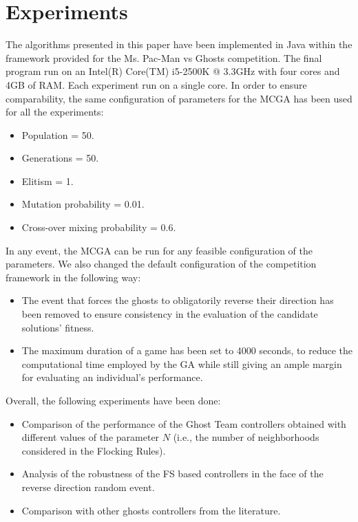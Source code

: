\documentclass[journal]{IEEEtran}
\begin{document}
\section{Experiments}
\label{sec:Experiments}
The algorithms presented in this paper have been implemented in Java within the framework provided for the Ms. Pac-Man vs Ghosts competition. The final program run on an Intel(R) Core(TM) i5-2500K @ 3.3GHz with four cores and 4GB of RAM. Each experiment run on a single core. In order to ensure comparability, the same configuration of parameters for the MCGA has been used for all the experiments:

\begin{itemize}
  \item Population = 50.
  \item Generations = 50.
  \item Elitism = 1.
  \item Mutation probability = 0.01.
  \item Cross-over mixing probability = 0.6.
\end{itemize}

In any event, the MCGA can be run for any feasible configuration of the parameters. We also changed the default configuration of the competition framework in the following way:

\begin{itemize}
  \item The event that forces the ghosts to obligatorily reverse their direction has been removed to ensure consistency in the evaluation of the candidate solutions' fitness.
  \item The maximum duration of a game has been set to 4000 seconds, to reduce the computational time employed by the GA while still giving an ample margin for evaluating an individual's performance.
\end{itemize}

Overall, the following experiments have been done:

\begin{itemize}
  \item Comparison of the performance of the Ghost Team controllers obtained with different values of the parameter $N$ (i.e., the number of neighborhoods considered in the Flocking Rules).
  \item Analysis of the robustness of the FS based controllers in the face of the reverse direction random event.
  \item Comparison with other ghosts controllers from the literature.
\end{itemize}
\end{document}
